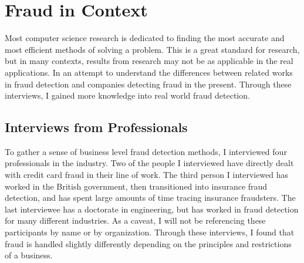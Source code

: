 \documentclass[midd]{thesis}
\begin{document}
\noindent

\pagebreak
\chapter{ Fraud in Context}
\label{sec:context}

Most computer science research is dedicated to finding the most accurate and most efficient methods of solving a problem. This is a great standard for research, but in many contexts, results from research may not be as applicable in the real applications. In an attempt to understand the differences between related works in fraud detection and companies detecting fraud in the present. Through these interviews, I gained more knowledge into real world fraud detection.

\section{ Interviews from Professionals}

To gather a sense of business level fraud detection methods, I interviewed four professionals in the industry. Two of the people I interviewed have directly dealt with credit card fraud in their line of work. The third person I interviewed has worked in the British government, then transitioned into insurance fraud detection, and has spent large amounts of time tracing insurance fraudsters. The last interviewee has a doctorate in engineering, but has worked in fraud detection for many different industries. As a caveat, I will not be referencing these participants by name or by organization. Through these interviews, I found that fraud is handled slightly differently depending on the principles and restrictions of a business.
\end{document}
